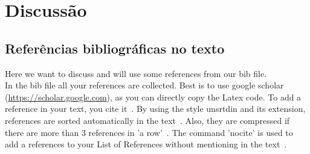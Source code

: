 \clearpage

\chapter{\textbf{Discussão}}\label{discussion}
\section{Referências bibliográficas no texto}
Here we want to discuss and will use some references from our bib file. \\
In the bib file all your references are collected. Best is to use google scholar (\url{https://scholar.google.com}), as you can directly copy the Latex code. To add a reference in your text, you cite it~\cite{Amini12}. By using the style unsrtdin and its extension, references are sorted automatically in the text~\cite{Amini12,Bajpai12}. Also, they are compressed if there are more than 3 references in 'a row'~\cite{Carpenter79,Davis11,Eurotransplant17,Falcone93}. The command 'nocite' is used to add a references to your List of References without mentioning in the text~\nocite{website:chick}.


